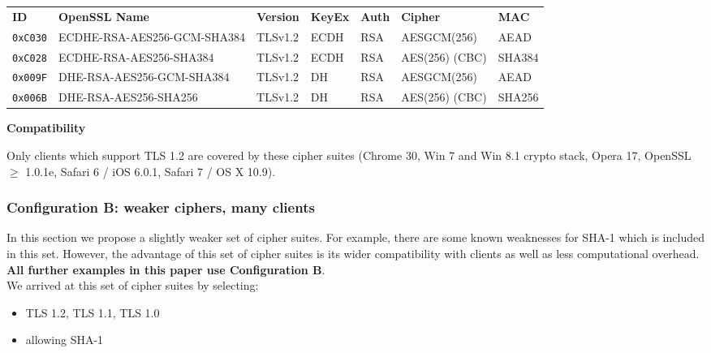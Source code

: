 \begin{center}

\begin{tabular}{lllllll}
\toprule
\textbf{ID}   & \textbf{OpenSSL Name}       & \textbf{Version} & \textbf{KeyEx} & \textbf{Auth} & \textbf{Cipher} & \textbf{MAC}\\\cmidrule(lr){1-7}
\verb|0xC030| & ECDHE-RSA-AES256-GCM-SHA384 & TLSv1.2          & ECDH           &  RSA          & AESGCM(256)     & AEAD         \\
\verb|0xC028| & ECDHE-RSA-AES256-SHA384     & TLSv1.2          & ECDH           &  RSA          & AES(256) (CBC)  & SHA384       \\
\verb|0x009F| & DHE-RSA-AES256-GCM-SHA384   & TLSv1.2          & DH             &  RSA          & AESGCM(256)     & AEAD         \\
\verb|0x006B| & DHE-RSA-AES256-SHA256       & TLSv1.2          & DH             &  RSA          & AES(256) (CBC)  & SHA256       \\
\bottomrule
\end{tabular}
\end{center}


\textbf{Compatibility}

Only clients which support TLS 1.2 are covered by these cipher suites (Chrome 30,
Win 7 and Win 8.1 crypto stack, Opera 17, OpenSSL $\ge$ 1.0.1e, Safari 6 / iOS
6.0.1, Safari 7 / OS X 10.9).



\subsubsection{Configuration B: weaker ciphers, many clients}

In this section we propose a slightly weaker set of cipher suites. 
For example, there are some known weaknesses for SHA-1 which is included in this set.
However, the advantage of this set of cipher suites is its wider compatibility
with clients as well as less computational overhead.\\ 

\textbf{All further examples in this paper use Configuration B}.\\

We arrived at this set of cipher suites by selecting:

\begin{itemize}
\item TLS 1.2, TLS 1.1, TLS 1.0
\item allowing SHA-1

\end{itemize}

